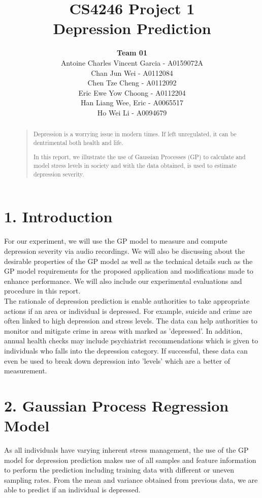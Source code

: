 \documentclass{article}
\title{
	CS4246 Project 1\\ Depression Prediction
}
\author{
	{\bf Team 01} \\
	Antoine Charles Vincent Garcia - A0159072A\\
	Chan Jun Wei - A0112084\\
	Chen Tze Cheng - A0112092\\
	Eric Ewe Yow Choong - A0112204\\
	Han Liang Wee, Eric - A0065517\\
	Ho Wei Li - A0094679\\
}
\begin{document}
 	\maketitle

	\begin{abstract}
	\begin{quote}
	Depression is a worrying issue in modern times. If left unregulated, it can be dentrimental both health and life.
	
	In this report, we illustrate the use of Gaussian Processes (GP) to calculate and model stress levels in society and with the data obtained, is used to estimate depression severity. \\
	\end{quote}
	\end{abstract}
	
	\section{1. Introduction}
	For our experiment, we will use the GP model to measure and compute depression severity via audio recordings. We will also be discussing about the desirable properties of the GP model as well as the technical details such as the GP model requirements for the proposed application and modifications made to enhance performance. We will also include our experimental evaluations and procedure in this report.\\

	The rationale of depression prediction is enable authorities to take appropriate actions if an area or individual is depressed. For example, suicide and crime are often linked to high depression and stress levels. The data can help authorities to monitor and mitigate crime in areas with marked as 'depressed'. In addition, annual health checks may include psychiatrist recommendations which is given to individuals who falls into the depression category. If successful, these data can even be used to break down depression into 'levels' which are a better of measurement. \\

	\section{2. Gaussian Process Regression Model}
	As all individuals have varying inherent stress management, the use of the GP model for depression prediction makes use of all samples and feature information to perform the prediction including training data with different or uneven sampling rates. From the mean and variance obtained from previous data, we are able to predict if an individual is depressed. \\	
\end{document}
